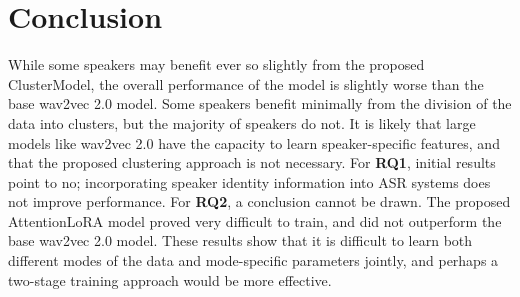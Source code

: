 \section{Conclusion}

While some speakers may benefit ever so slightly from the proposed ClusterModel, the overall performance of the model is slightly worse than the base wav2vec 2.0 model.
Some speakers benefit minimally from the division of the data into clusters, but the majority of speakers do not.
It is likely that large models like wav2vec 2.0 have the capacity to learn speaker-specific features, and that the proposed clustering approach is not necessary.
For \textbf{RQ1}, initial results point to no; incorporating speaker identity information into ASR systems does not improve performance.
For \textbf{RQ2}, a conclusion cannot be drawn.
The proposed AttentionLoRA model proved very difficult to train, and did not outperform the base wav2vec 2.0 model.
These results show that it is difficult to learn both different modes of the data and mode-specific parameters jointly, and perhaps a two-stage training approach would be more effective.


